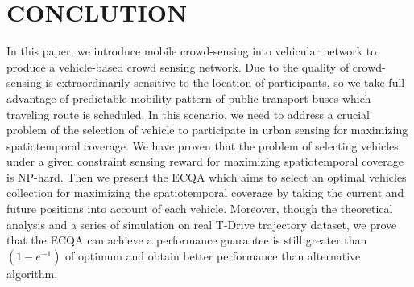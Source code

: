 \documentclass[journal]{IEEEtran}
\begin{document}
\section{CONCLUTION}
In this paper, we introduce mobile crowd-sensing into vehicular network to produce a vehicle-based crowd sensing network. Due to the quality of crowd-sensing is extraordinarily sensitive to the location of participants, so we take full advantage of predictable mobility pattern of public transport buses which traveling route is scheduled. In this scenario, we need to address a crucial problem of the selection of vehicle to participate in urban sensing for maximizing spatiotemporal coverage. We have proven that the problem of selecting vehicles under a given constraint sensing reward for maximizing spatiotemporal coverage is NP-hard. Then we present the ECQA which aims to select an optimal vehicles collection for maximizing the spatiotemporal coverage by taking the current and future positions into account of each vehicle. Moreover, though the theoretical analysis and a series of simulation on real T-Drive trajectory dataset, we prove that the ECQA can achieve a performance guarantee is still greater than $(1-e^{-1})$ of optimum and obtain better performance than alternative algorithm.












%
%
\end{document}

